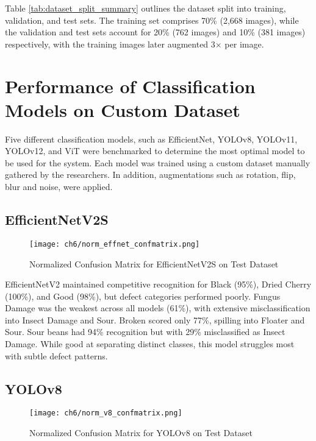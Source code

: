 Table \ref{tab:dataset_split_summary} outlines the dataset split into training, validation, and test sets. The training set comprises 70\% (2,668 images), while the validation and test sets account for 20\% (762 images) and 10\% (381 images) respectively, with the training images later augmented 3× per image.

\section{Performance of Classification Models on Custom Dataset}
\label{sec:perf_custom_dataset}
Five different classification models, such as EfficientNet, YOLOv8, YOLOv11, YOLOv12, and ViT were benchmarked to determine the most optimal model to be used for the system. Each model was trained using a custom dataset manually gathered by the researchers. In addition, augmentations such as rotation, flip, blur and noise, were applied. 

\subsection{EfficientNetV2S}

\begin{figure}[H]
    \centering
    \texttt{[image: ch6/norm\_effnet\_confmatrix.png]} %
    \caption{Normalized Confusion Matrix for EfficientNetV2S on Test Dataset}
    \label{fig:effnetv2s_conf_matrix}
\end{figure}

EfficientNetV2 maintained competitive recognition for Black (95\%), Dried Cherry (100\%), and Good (98\%), but defect categories performed poorly. Fungus Damage was the weakest across all models (61\%), with extensive misclassification into Insect Damage and Sour. Broken scored only 77\%, spilling into Floater and Sour. Sour beans had 94\% recognition but with 29\% misclassified as Insect Damage. While good at separating distinct classes, this model struggles most with subtle defect patterns.

\subsection{YOLOv8}

\begin{figure}[H]
    \centering
    \texttt{[image: ch6/norm\_v8\_confmatrix.png]} %
    \caption{Normalized Confusion Matrix for YOLOv8 on Test Dataset}
    \label{fig:yolov8_conf_matrix}
\end{figure}

